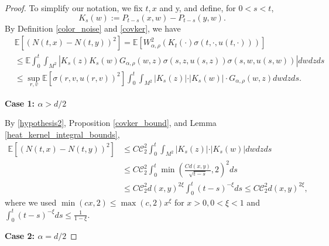\documentclass[12pt]{amsart}
\numberwithin{equation}{section}
\newcommand{\1}{\mathbf{1}}
\begin{document}
\begin{proof}
To simplify our notation, we fix $t,x$ and y, and define, for $0<s<t$,
\begin{equation*}
    K_s(w):=P_{t-s}(x,w)-P_{t-s}(y,w).
\end{equation*}
By Definition \ref{color_noise} and \eqref{covker}, we have
\begin{equation}
\label{spatial_regularity_proof}
\begin{split}
&\mathbb{E}\left[(N(t,x)-N(t,y))^2\right]= \mathbb{E}\left[W^2_{\alpha,\rho}(K_t(\cdot)\sigma(t,\cdot,u(t,\cdot)))\right]\\
&\leq \mathbb{E}\int_0^t\int_{M^2}\left\vert K_s(z)K_s(w)G_{\alpha,\rho}(w,z)\sigma(s,z,u(s,z))\sigma(s,w,u(s,w))\right\vert dwdzds\\
&\leq \sup_{r,v}\mathbb{E}\left[\sigma(r,v,u(r,v))^2\right]\int_0^t\int_{M^2}\vert K_s(z)\vert\cdot \vert K_s(w)\vert\cdot G_{\alpha,\rho}(w,z)dwdzds.
\end{split}
\end{equation}

\textbf{Case 1: $\alpha>d/2$}

By \eqref{hypothesis2}, Proposition \ref{covker_bound}, and Lemma \ref{heat_kernel_integral_bounds},
\begin{equation*}
\begin{split}
\mathbb{E}\left[(N(t,x)-N(t,y))^2\right]&\leq C\mathcal{C}_2^2
\int_0^t\int_{M^2}\vert K_s(z)\vert\cdot \vert K_s(w)\vert dwdzds\\
&\leq C\mathcal{C}_2^2\int_0^t\min\left(\frac{Cd(x,y)}{\sqrt{t-s}},2\right)^2ds\\
&\leq C\mathcal{C}_2^2d(x,y)^{2\xi}\int_0^t(t-s)^{-\xi}ds\leq C\mathcal{C}_2^2d(x,y)^{2\xi},
\end{split}
\end{equation*}
where we used $\min(cx,2)\leq\max(c,2)x^\xi$ for $x>0, 0<\xi<1$ and $\int_0^t(t-s)^{-\xi}ds\leq\frac{1}{1-\xi}$.

\textbf{Case 2: $\alpha=d/2$}


\end{proof}
\end{document}
